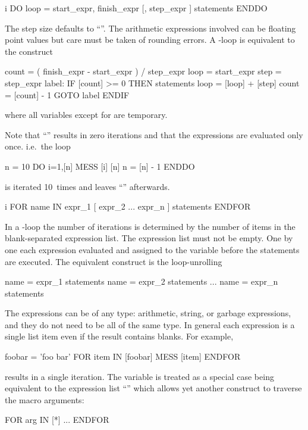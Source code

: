 \label{ref:DO}

\begin{Gray}{i}
DO loop = start_expr, finish_expr  [, step_expr ]
   statements
ENDDO
\end{Gray}
The step size defaults to ``''.
The arithmetic expressions involved can be floating point values but
care must be taken of rounding errors.
A -loop is equivalent to the construct
\begin{XMP}
count = ( finish_expr - start_expr ) / step_expr
loop = start_expr
step = step_expr
label:
IF [count] >= 0 THEN
   statements
   loop = [loop] + [step]
   count = [count] - 1
   GOTO label
ENDIF
\end{XMP}
where all variables except for  are temporary.

Note that ``'' results in zero iterations and that the
expressions are evaluated only once. i.e.\ the loop
\begin{XMP}
n = 10
DO i=1,[n]
   MESS [i] [n]
   n = [n] - 1
ENDDO
\end{XMP}
is iterated 10~times and leaves ``'' afterwards.


\label{ref:FOR}
 
\begin{Gray}{i}
FOR name IN expr_1 [ expr_2 ... expr_n ]
   statements
ENDFOR
\end{Gray}
In a -loop the number of iterations is determined by the
number of items in the blank-separated expression list.
The expression list must not be empty.
One by one each expression evaluated and assigned to
the variable  before the statements are executed.
The equivalent construct is the loop-unrolling
\begin{XMP}
name = expr_1
statements
name = expr_2
statements
...
name = expr_n
statements
\end{XMP}

The expressions can be of any type: arithmetic, string, or garbage
expressions, and they do not need to be all of the same type.
In general each expression is a single list item even if the result
contains blanks.
For example,
\begin{XMP}
foobar = 'foo bar'
FOR item IN [foobar]
   MESS [item]
ENDFOR
\end{XMP}
results in a single iteration.
The variable \Lit{[*]} is treated as a special case being 
equivalent to the expression list ``''
which allows yet another construct to traverse the macro arguments:
\begin{XMP}
FOR arg IN [*]
   ...
ENDFOR
\end{XMP}


